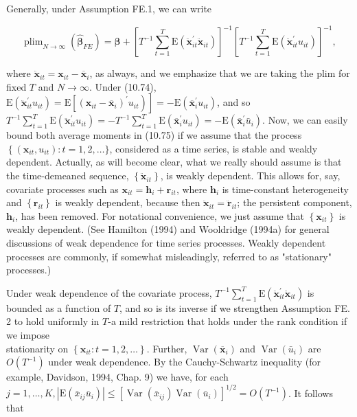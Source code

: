 \documentclass[10pt]{article}
\begin{document}
Generally, under Assumption FE.1, we can write


\begin{equation*}
\operatorname{plim}_{N \rightarrow \infty}\left(\hat{\boldsymbol{\beta}}_{F E}\right)=\boldsymbol{\beta}+\left[T^{-1} \sum_{t=1}^{T} \mathrm{E}\left(\ddot{\mathbf{x}}_{i t}^{\prime} \ddot{\mathbf{x}}_{i t}\right)\right]^{-1}\left[T^{-1} \sum_{t=1}^{T} \mathrm{E}\left(\ddot{\mathbf{x}}_{i t}^{\prime} u_{i t}\right)\right]^{-1}, \tag{10.75}
\end{equation*}


where $\ddot{\mathbf{x}}_{i t}=\mathbf{x}_{i t}-\overline{\mathbf{x}}_{i}$, as always, and we emphasize that we are taking the plim for fixed $T$ and $N \rightarrow \infty$. Under (10.74), $\left.\mathrm{E}\left(\ddot{\mathbf{x}}_{i t}^{\prime} u_{i t}\right)=\mathrm{E}\left[\left(\mathbf{x}_{i t}-\overline{\mathbf{x}}_{i}\right)^{\prime} u_{i t}\right)\right]=-\mathrm{E}\left(\overline{\mathbf{x}}_{i}^{\prime} u_{i t}\right)$, and so $T^{-1} \sum_{t=1}^{T} \mathrm{E}\left(\ddot{\mathbf{x}}_{i t}^{\prime} u_{i t}\right)=-T^{-1} \sum_{t=1}^{T} \mathrm{E}\left(\overline{\mathbf{x}}_{i}^{\prime} u_{i t}\right)=-\mathrm{E}\left(\overline{\mathbf{x}}_{i}^{\prime} \bar{u}_{i}\right)$. Now, we can easily bound both average moments in (10.75) if we assume that the process $\left\{\left(\mathbf{x}_{i t}, u_{i t}\right): t=\right. 1,2, \ldots\}$, considered as a time series, is stable and weakly dependent. Actually, as will become clear, what we really should assume is that the time-demeaned sequence, $\left\{\ddot{\mathbf{x}}_{i t}\right\}$, is weakly dependent. This allows for, say, covariate processes such as $\mathbf{x}_{i t}= \mathbf{h}_{i}+\mathbf{r}_{i t}$, where $\mathbf{h}_{i}$ is time-constant heterogeneity and $\left\{\mathbf{r}_{i t}\right\}$ is weakly dependent, because then $\ddot{\mathbf{x}}_{i t}=\ddot{\mathbf{r}}_{i t}$; the persistent component, $\mathbf{h}_{i}$, has been removed. For notational convenience, we just assume that $\left\{\mathbf{x}_{i t}\right\}$ is weakly dependent. (See Hamilton (1994) and Wooldridge (1994a) for general discussions of weak dependence for time series processes. Weakly dependent processes are commonly, if somewhat misleadingly, referred to as "stationary" processes.)

Under weak dependence of the covariate process, $T^{-1} \sum_{t=1}^{T} \mathrm{E}\left(\ddot{\mathbf{x}}_{i t}^{\prime} \ddot{\mathbf{x}}_{i t}\right)$ is bounded as a function of $T$, and so is its inverse if we strengthen Assumption FE. 2 to hold uniformly in $T$-a mild restriction that holds under the rank condition if we impose\\
stationarity on $\left\{\mathbf{x}_{i t}: t=1,2, \ldots\right\}$. Further, $\operatorname{Var}\left(\overline{\mathbf{x}}_{i}\right)$ and $\operatorname{Var}\left(\bar{u}_{i}\right)$ are $O\left(T^{-1}\right)$ under weak dependence. By the Cauchy-Schwartz inequality (for example, Davidson, 1994, Chap. 9) we have, for each $j=1, \ldots, K,\left|\mathrm{E}\left(\bar{x}_{i j} \bar{u}_{i}\right)\right| \leq\left[\operatorname{Var}\left(\bar{x}_{i j}\right) \operatorname{Var}\left(\bar{u}_{i}\right)\right]^{1 / 2}=O\left(T^{-1}\right)$. It follows that
\end{document}
